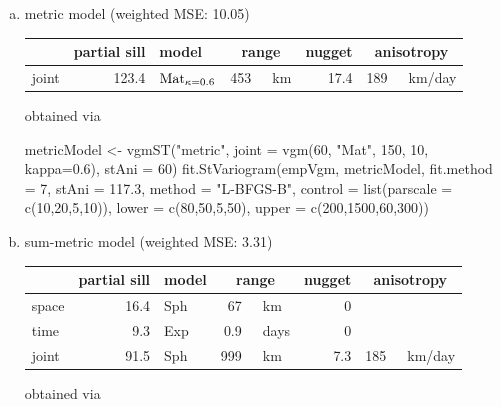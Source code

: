 \begin{enumerate}[a)]
\item 
metric model (weighted MSE: 10.05)

\nopagebreak
\begin{tabular}{l|rlrlrrl}
\toprule
  & partial sill & model & \multicolumn{2}{c}{range}  & nugget & \multicolumn{2}{c}{anisotropy}\\ \midrule  
joint & 123.4 & ${\rm Mat}_{\kappa=0.6}$ & 453 & \hspace{-2\tabcolsep}~km & 17.4 & 189 & \hspace{-2\tabcolsep}~km/day \\ \bottomrule
\end{tabular}

obtained via

\begin{example*}
metricModel <- vgmST("metric",
                     joint = vgm(60, "Mat", 150, 10, kappa=0.6),
                     stAni = 60)
fit.StVariogram(empVgm, metricModel, fit.method = 7,
                stAni = 117.3, method = "L-BFGS-B",
                control = list(parscale = c(10,20,5,10)),
                lower = c(80,50,5,50),
                upper = c(200,1500,60,300))
\end{example*}

\item\label{bestfit} 
sum-metric model (weighted MSE: 3.31)

\nopagebreak
\begin{tabular}{l|rlrlrrl}
\toprule
          & partial sill & model & \multicolumn{2}{c}{range}  & nugget & \multicolumn{2}{c}{anisotropy}\\ \midrule  
space  & 16.4 & Sph & 67 & \hspace{-2\tabcolsep}~km    & 0 & & \\
time    &  9.3 & Exp & 0.9 & \hspace{-2\tabcolsep}~days & 0 & & \\
joint    & 91.5 & Sph & 999 & \hspace{-2\tabcolsep}~km  & 7.3 & 185 & \hspace{-2\tabcolsep}~km/day \\ \bottomrule
\end{tabular}

obtained via


\end{enumerate}
